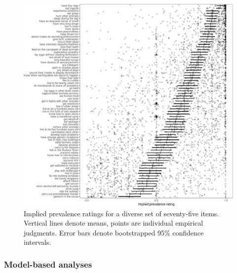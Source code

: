 \documentclass[floatsintext,doc]{apa6}
\begin{document}
\begin{figure}
\centering
\includegraphics{genint_files/figure-latex/genint-empiricalData-1.pdf}
\caption{\label{fig:genint-empiricalData}Implied prevalence ratings for a diverse set of seventy-five items. Vertical lines denote means, points are individual empirical judgments. Error bars denote bootstrapped 95\% confidence intervals.}
\end{figure}


\hypertarget{model-based-analyses}{%
\subsubsection{Model-based analyses}\label{model-based-analyses}}
\end{document}
